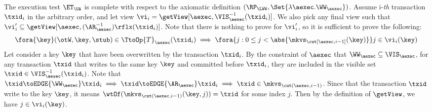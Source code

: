 The execution test $\ET_\UA$ is complete with respect to 
the axiomatic definition \( (\RP_{\LWW}, \Set{\lambda \aexec. \WW_\aexec }) \).
Assume i-\emph{th} transaction \( \txid_i \) in the arbitrary order,
and let view \( \vi_{i} = \getView[\aexec, \VIS^{-1}_{\aexec}(\txid_{i})] \).
We also pick any final view such that \( \vi'_{i} \subseteq \getView[\aexec, (\AR^{-1}_{\aexec})\rflx(\txid_{i})] \).
Note that there is nothing to prove for \( \vi'_i \),
so it is sufficient to prove the following:
\[
    \fora{\key} (\otW, \key, \stub) \in \TtoOp{T}_{\aexec}(\txid_{i}) 
    \implies 
    \fora{j : 0 \leq j < \abs{\mkvs_{\cut[\aexec, i-1]}(\key)}} j \in \vi_i(\key)
\]
Let consider a key \( \key \) that have been overwritten by the transaction \( \txid_i \).
By the constraint of \( \aexec \) that \( \WW_\aexec \subseteq \VIS_\aexec \),
for any transaction \( \txid \) that writes to the same key \( \key \) and committed before \( \txid_i \), 
they are included in the visible set \(\txid \in \VIS^{-1}_{\aexec}(\txid_{i}) \).
Note that \( \txid \toEDGE{\WW_\aexec} \txid_i \implies \txid \toEDGE{\AR_\aexec} \txid_i \implies \txid \in \mkvs_{\cut(\aexec,i-1)}\).
Since that the transaction \( \txid \) write to the key \( \key \),
it means \( \wtOf(\mkvs_{\cut(\aexec, i-1)}(\key,j)) = \txid \) for some index \( j \).
Then by the definition of \( \getView \), we have \( j \in \vi_i(\key)\).
